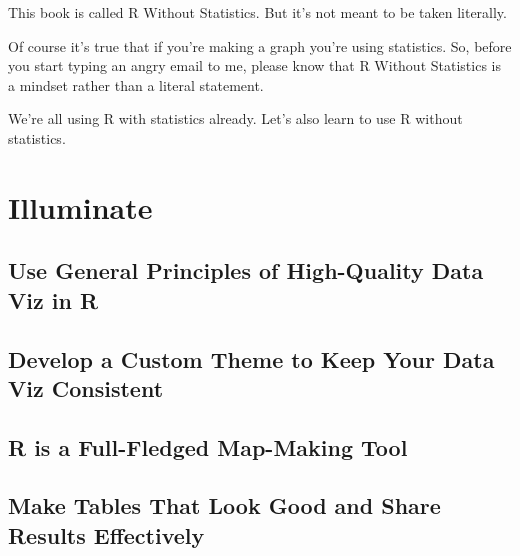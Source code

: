 \documentclass[
]{book}
\begin{document}
This book is called R Without Statistics. But it's not meant to be taken literally.

Of course it's true that if you're making a graph you're using statistics. So, before you start typing an angry email to me, please know that R Without Statistics is a mindset rather than a literal statement.

We're all using R with statistics already. Let's also learn to use R without statistics.

\hypertarget{part-illuminate}{%
\part*{Illuminate}\label{part-illuminate}}

\hypertarget{use-general-principles-of-high-quality-data-viz-in-r}{%
\chapter*{Use General Principles of High-Quality Data Viz in R}\label{use-general-principles-of-high-quality-data-viz-in-r}}

\hypertarget{develop-a-custom-theme-to-keep-your-data-viz-consistent}{%
\chapter*{Develop a Custom Theme to Keep Your Data Viz Consistent}\label{develop-a-custom-theme-to-keep-your-data-viz-consistent}}

\hypertarget{r-is-a-full-fledged-map-making-tool}{%
\chapter*{R is a Full-Fledged Map-Making Tool}\label{r-is-a-full-fledged-map-making-tool}}

\hypertarget{make-tables-that-look-good-and-share-results-effectively}{%
\chapter*{Make Tables That Look Good and Share Results Effectively}\label{make-tables-that-look-good-and-share-results-effectively}}
\end{document}
